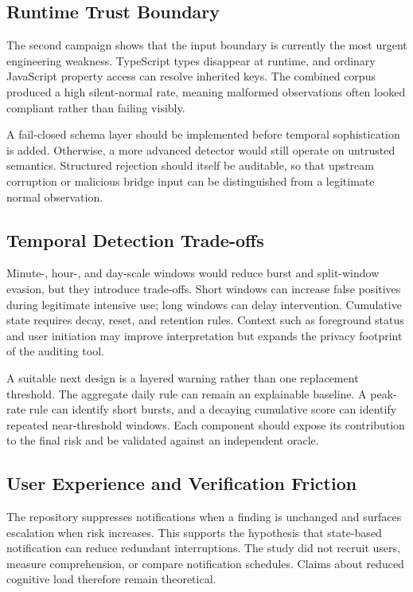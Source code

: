 \subsection{Runtime Trust Boundary}

The second campaign shows that the input boundary is currently the most urgent engineering weakness. TypeScript types disappear at runtime, and ordinary JavaScript property access can resolve inherited keys. The combined corpus produced a high silent-normal rate, meaning malformed observations often looked compliant rather than failing visibly.

A fail-closed schema layer should be implemented before temporal sophistication is added. Otherwise, a more advanced detector would still operate on untrusted semantics. Structured rejection should itself be auditable, so that upstream corruption or malicious bridge input can be distinguished from a legitimate normal observation.

\subsection{Temporal Detection Trade-offs}

Minute-, hour-, and day-scale windows would reduce burst and split-window evasion, but they introduce trade-offs. Short windows can increase false positives during legitimate intensive use; long windows can delay intervention. Cumulative state requires decay, reset, and retention rules. Context such as foreground status and user initiation may improve interpretation but expands the privacy footprint of the auditing tool.

A suitable next design is a layered warning rather than one replacement threshold. The aggregate daily rule can remain an explainable baseline. A peak-rate rule can identify short bursts, and a decaying cumulative score can identify repeated near-threshold windows. Each component should expose its contribution to the final risk and be validated against an independent oracle.

\subsection{User Experience and Verification Friction}

The repository suppresses notifications when a finding is unchanged and surfaces escalation when risk increases. This supports the hypothesis that state-based notification can reduce redundant interruptions. The study did not recruit users, measure comprehension, or compare notification schedules. Claims about reduced cognitive load therefore remain theoretical.

